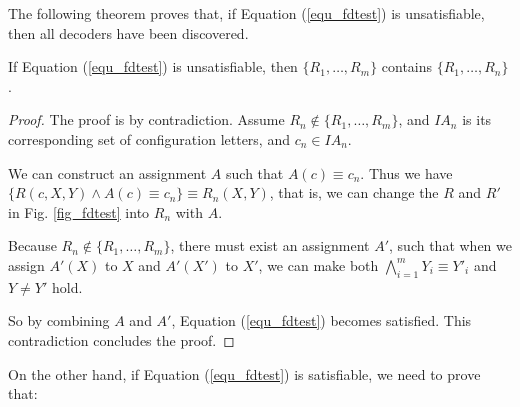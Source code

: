 \documentclass[journal]{IEEEtran}
\begin{document}
The following theorem proves that,
if Equation (\ref{equ_fdtest}) is unsatisfiable,
then all decoders have been discovered.

\begin{theorem}[]\label{thm_fdok}
If Equation (\ref{equ_fdtest}) is unsatisfiable,
then $\{R_1,\dots,R_{m}\}$ contains $\{R_1,\dots,R_{n}\}$.
\end{theorem}
\begin{proof}
The proof is by contradiction.
Assume $R_n\notin \{R_1,\dots,R_m\}$,
and $IA_n$ is its corresponding set of configuration letters,
and $c_n\in IA_n$.

We can construct an assignment $A$ such that $A(c)\equiv c_n$.
Thus we have $\{R(c,X,Y)\wedge A(c)\equiv c_n\} \equiv R_n(X,Y)$,
that is,
we can change the $R$ and $R'$ in Fig. \ref{fig_fdtest} into $R_n$ with $A$.

Because $R_n\notin \{R_1,\dots,R_m\}$,
there must exist an assignment $A'$,
such that when we assign $A'(X)$ to $X$ and $A'(X')$ to $X'$,
we can make both $\bigwedge_{i=1}^{m}Y_i\equiv Y'_i$ and $Y\ne Y'$ hold.

So by combining $A$ and $A'$,
Equation (\ref{equ_fdtest}) becomes satisfied.
This contradiction concludes the proof.
\end{proof}



On the other hand,
if Equation (\ref{equ_fdtest}) is satisfiable,
we need to prove that:
\end{document}
